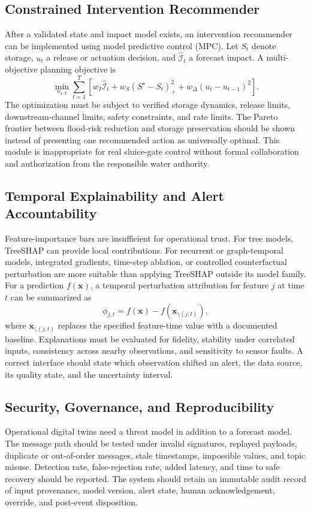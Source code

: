 \documentclass[journal]{IEEEtran}
\begin{document}
\subsection{Constrained Intervention Recommender}
After a validated state and impact model exists, an intervention recommender can be implemented using model predictive control (MPC). Let $S_t$ denote storage, $u_t$ a release or actuation decision, and $\widehat{\mathcal{I}}_t$ a forecast impact. A multi-objective planning objective is
\begin{equation}
\min_{u_{1:T}}\sum_{t=1}^{T}\left[w_I\widehat{\mathcal{I}}_t+w_S(S^\star-S_t)_+^2+w_\Delta(u_t-u_{t-1})^2\right].
\label{eq:mpc2}
\end{equation}
The optimization must be subject to verified storage dynamics, release limits, downstream-channel limits, safety constraints, and rate limits. The Pareto frontier between flood-risk reduction and storage preservation should be shown instead of presenting one recommended action as universally optimal. This module is inappropriate for real sluice-gate control without formal collaboration and authorization from the responsible water authority.

\subsection{Temporal Explainability and Alert Accountability}
Feature-importance bars are insufficient for operational trust. For tree models, TreeSHAP can provide local contributions. For recurrent or graph-temporal models, integrated gradients, time-step ablation, or controlled counterfactual perturbation are more suitable than applying TreeSHAP outside its model family. For a prediction $f(\mathbf{x})$, a temporal perturbation attribution for feature $j$ at time $t$ can be summarized as
\begin{equation}
\phi_{j,t}=f(\mathbf{x})-f(\mathbf{x}_{\setminus(j,t)}),
\label{eq:attribution}
\end{equation}
where $\mathbf{x}_{\setminus(j,t)}$ replaces the specified feature-time value with a documented baseline. Explanations must be evaluated for fidelity, stability under correlated inputs, consistency across nearby observations, and sensitivity to sensor faults. A correct interface should state which observation shifted an alert, the data source, its quality state, and the uncertainty interval.

\subsection{Security, Governance, and Reproducibility}
Operational digital twins need a threat model in addition to a forecast model. The message path should be tested under invalid signatures, replayed payloads, duplicate or out-of-order messages, stale timestamps, impossible values, and topic misuse. Detection rate, false-rejection rate, added latency, and time to safe recovery should be reported. The system should retain an immutable audit record of input provenance, model version, alert state, human acknowledgement, override, and post-event disposition.
\end{document}
